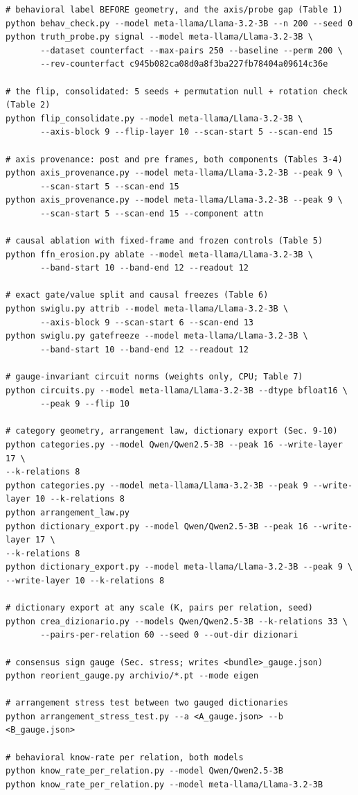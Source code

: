 \documentclass[11pt]{article}
\begin{document}
\begin{verbatim}
# behavioral label BEFORE geometry, and the axis/probe gap (Table 1)
python behav_check.py --model meta-llama/Llama-3.2-3B --n 200 --seed 0
python truth_probe.py signal --model meta-llama/Llama-3.2-3B \
       --dataset counterfact --max-pairs 250 --baseline --perm 200 \
       --rev-counterfact c945b082ca08d0a8f3ba227fb78404a09614c36e

# the flip, consolidated: 5 seeds + permutation null + rotation check (Table 2)
python flip_consolidate.py --model meta-llama/Llama-3.2-3B \
       --axis-block 9 --flip-layer 10 --scan-start 5 --scan-end 15

# axis provenance: post and pre frames, both components (Tables 3-4)
python axis_provenance.py --model meta-llama/Llama-3.2-3B --peak 9 \
       --scan-start 5 --scan-end 15
python axis_provenance.py --model meta-llama/Llama-3.2-3B --peak 9 \
       --scan-start 5 --scan-end 15 --component attn

# causal ablation with fixed-frame and frozen controls (Table 5)
python ffn_erosion.py ablate --model meta-llama/Llama-3.2-3B \
       --band-start 10 --band-end 12 --readout 12

# exact gate/value split and causal freezes (Table 6)
python swiglu.py attrib --model meta-llama/Llama-3.2-3B \
       --axis-block 9 --scan-start 6 --scan-end 13
python swiglu.py gatefreeze --model meta-llama/Llama-3.2-3B \
       --band-start 10 --band-end 12 --readout 12

# gauge-invariant circuit norms (weights only, CPU; Table 7)
python circuits.py --model meta-llama/Llama-3.2-3B --dtype bfloat16 \
       --peak 9 --flip 10

# category geometry, arrangement law, dictionary export (Sec. 9-10)
python categories.py --model Qwen/Qwen2.5-3B --peak 16 --write-layer 17 \
--k-relations 8
python categories.py --model meta-llama/Llama-3.2-3B --peak 9 --write-layer 10 --k-relations 8
python arrangement_law.py
python dictionary_export.py --model Qwen/Qwen2.5-3B --peak 16 --write-layer 17 \
--k-relations 8
python dictionary_export.py --model meta-llama/Llama-3.2-3B --peak 9 \
--write-layer 10 --k-relations 8

# dictionary export at any scale (K, pairs per relation, seed)
python crea_dizionario.py --models Qwen/Qwen2.5-3B --k-relations 33 \
       --pairs-per-relation 60 --seed 0 --out-dir dizionari

# consensus sign gauge (Sec. stress; writes <bundle>_gauge.json)
python reorient_gauge.py archivio/*.pt --mode eigen

# arrangement stress test between two gauged dictionaries
python arrangement_stress_test.py --a <A_gauge.json> --b <B_gauge.json>

# behavioral know-rate per relation, both models
python know_rate_per_relation.py --model Qwen/Qwen2.5-3B
python know_rate_per_relation.py --model meta-llama/Llama-3.2-3B
\end{verbatim}
\end{document}
